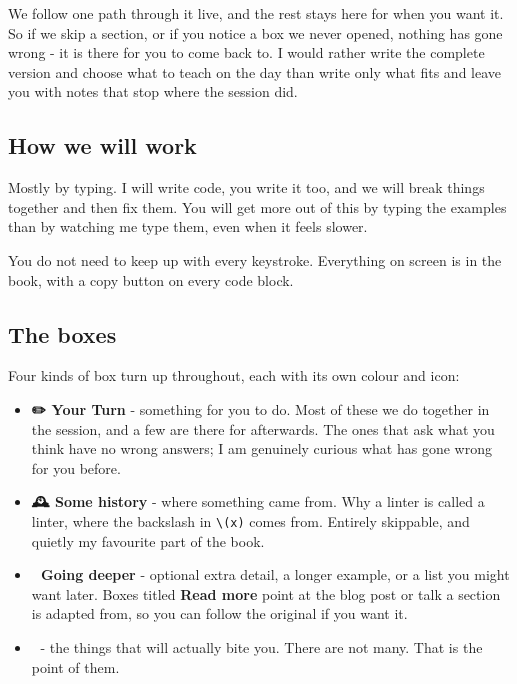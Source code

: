 \documentclass[
  letterpaper,
  justified,
  a4paper]{tufte-book}
\providecommand{\tightlist}{%
  \setlength{\itemsep}{0pt}\setlength{\parskip}{0pt}}
\providecommand{\tightlist}{%
  \setlength{\itemsep}{0pt}\setlength{\parskip}{0pt}}
\begin{document}
We follow one path through it live, and the rest stays here for when you
want it. So if we skip a section, or if you notice a box we never
opened, nothing has gone wrong - it is there for you to come back to. I
would rather write the complete version and choose what to teach on the
day than write only what fits and leave you with notes that stop where
the session did.

\subsection*{How we will work}\label{how-we-will-work}

Mostly by typing. I will write code, you write it too, and we will break
things together and then fix them. You will get more out of this by
typing the examples than by watching me type them, even when it feels
slower.

You do not need to keep up with every keystroke. Everything on screen is
in the book, with a copy button on every code block.

\subsection*{The boxes}\label{the-boxes}

Four kinds of box turn up throughout, each with its own colour and icon:

\begin{itemize}
\tightlist
\item
  \textbf{✏️ Your Turn} - something for you to do. Most of these we do
  together in the session, and a few are there for afterwards. The ones
  that ask what you think have no wrong answers; I am genuinely curious
  what has gone wrong for you before.
\item
  \textbf{🕰️ Some history} - where something came from. Why a linter is
  called a linter, where the backslash in \texttt{\textbackslash{}(x)}
  comes from. Entirely skippable, and quietly my favourite part of the
  book.
\item
  \textbf{🔎 Going deeper} - optional extra detail, a longer example, or
  a list you might want later. Boxes titled \textbf{Read more} point at
  the blog post or talk a section is adapted from, so you can follow the
  original if you want it.
\item
  \textbf{🚨} - the things that will actually bite you. There are not
  many. That is the point of them.
\end{itemize}
\end{document}
